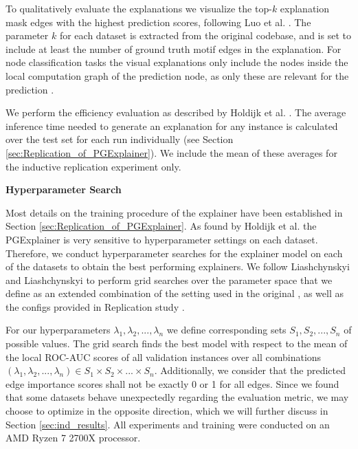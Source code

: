 To qualitatively evaluate the explanations we visualize the top-$k$ explanation mask edges with the highest prediction scores, following Luo et al. \cite{luo2020parameterized}. The parameter $k$ for each dataset is extracted from the original codebase, and is set to include at least the number of ground truth motif edges in the explanation. For node classification tasks the visual explanations only include the nodes inside the local computation graph of the prediction node, as only these are relevant for the prediction \cite{ying2019gnnexplainer}. \bigskip

We perform the efficiency evaluation as described by Holdijk et al. \cite{holdijk2021re}. The average inference time needed to generate an explanation for any instance is calculated over the test set for each run individually (see Section \ref{sec:Replication_of_PGExplainer}). We include the mean of these averages for the inductive replication experiment only. \bigskip

\textbf{Hyperparameter Search}\par
Most details on the training procedure of the explainer have been established in Section \ref{sec:Replication_of_PGExplainer}. As found by Holdijk et al. \cite{holdijk2021re} the PGExplainer is very sensitive to hyperparameter settings on each dataset. Therefore, we conduct hyperparameter searches for the explainer model on each of the datasets to obtain the best performing explainers. We follow Liashchynskyi and Liashchynskyi \cite{liashchynskyi2019grid} to perform grid searches over the parameter space that we define as an extended combination of the setting used in the original \cite{luo2020parameterized}, as well as the configs provided in Replication study \cite{holdijk2021re}. 

For our hyperparameters $\lambda_1,\lambda_2,...,\lambda_n$ we define corresponding sets $S_1,S_2,...,S_n$ of possible values. The grid search finds the best model with respect to the mean of the local ROC-AUC scores of all validation instances over all combinations $(\lambda_1,\lambda_2,...,\lambda_n) \in S_1\times S_2 \times...\times S_n$. Additionally, we consider that the predicted edge importance scores shall not be exactly 0 or 1 for all edges. Since we found that some datasets behave unexpectedly regarding the evaluation metric, we may choose to optimize in the opposite direction, which we will further discuss in Section \ref{sec:ind_results}. All experiments and training were conducted on an AMD Ryzen 7 2700X processor. \bigskip

